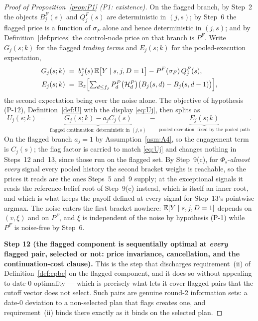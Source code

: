 \begin{proof}[Proof of Proposition~\ref{prop:P1} (P1: existence)]
On the flagged branch, by Step~2 the objects $B_j^F(s)$ and $Q_j^F(s)$ are deterministic in $(j,s)$;
by Step~6 the flagged price is a function of $\sigma_F$ alone and hence deterministic in $(j,s)$; and
by Definition~\ref{def:prices} the control-node price on that branch is $P^F$. Write $G_j(s;k)$ for
the flagged \emph{trading terms} and $E_j(s;k)$ for the pooled-execution expectation,
\begin{align*}
G_j(s;k) &\;=\; b_j^*(s)\,\mathbb{E}\bigl[Y \mid s,j,D=1\bigr] - P^F(\sigma_F)\,Q_j^F(s),\\
E_j(s;k) &\;=\; \mathbb{E}_{z}\Bigl[\textstyle\sum_{d \le f_j} P_d^P\bigl(\mathcal H_d^P\bigr)
\bigl(B_j(s,d)-B_j(s,d-1)\bigr)\Bigr],
\end{align*}
the second expectation being over the noise alone. The objective of hypothesis (P-12),
Definition~\ref{def:U} with the display \eqref{eq:Uj}, then splits as
\begin{equation}
\label{eq:P1-Udecomp}
U_j(s;k) \;=\; \underbrace{G_j(s;k) - a_j C_j(s)}_{\text{flagged continuation: deterministic in }(j,s)}
\;-\; \underbrace{E_j(s;k)}_{\text{pooled execution: fixed by the pooled path}} .
\end{equation}
On the flagged branch $a_j = 1$ by
Assumption~\ref{asm:A4}, so the engagement term is $C_j(s)$; the flag factor is carried to match
\eqref{eq:Uj} and changes nothing in Steps~12 and~13, since those run on the flagged set. By
Step~9(c), for $\Phi_s$-\emph{almost every} signal every pooled history the second bracket weighs is
reachable, so the prices it reads are the ones Steps~5 and~9 supply; at the exceptional signals it
reads the reference-belief root of Step~9(c) instead, which is itself an inner root, and which is
what keeps the payoff defined at every signal for Step~13's pointwise argmax. The noise enters the
first bracket nowhere: $\mathbb{E}[Y \mid s,j,D=1]$ depends on $(v,\xi)$ and on $P^F$, and $\xi$ is
independent of the noise by hypothesis (P-1) while $P^F$ is noise-free by Step~6.

\smallskip
\noindent\textbf{Step 12 (the flagged component is sequentially optimal at \emph{every} flagged pair,
selected or not: price invariance, cancellation, and the continuation-cost clause).}
This is the step that discharges requirement~(ii) of Definition~\ref{def:cpbe} on the flagged
component, and it does so without appealing to date-$0$ optimality --- which is precisely what lets
it cover flagged pairs that the cutoff vector does not select. Such pairs are genuine round-2
information sets: a date-$0$ deviation to a non-selected plan that flags creates one, and
requirement~(ii) binds there exactly as it binds on the selected plan.


\end{proof}
